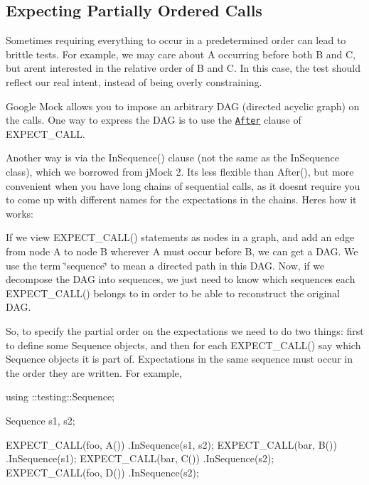 \subsection*{Expecting Partially Ordered Calls}

Sometimes requiring everything to occur in a predetermined order can lead to brittle tests. For example, we may care about {\ttfamily A} occurring before both {\ttfamily B} and {\ttfamily C}, but aren\textquotesingle{}t interested in the relative order of {\ttfamily B} and {\ttfamily C}. In this case, the test should reflect our real intent, instead of being overly constraining.

Google Mock allows you to impose an arbitrary D\+AG (directed acyclic graph) on the calls. One way to express the D\+AG is to use the \href{CheatSheet.md#the-after-clause}{\tt After} clause of {\ttfamily E\+X\+P\+E\+C\+T\+\_\+\+C\+A\+LL}.

Another way is via the {\ttfamily In\+Sequence()} clause (not the same as the {\ttfamily In\+Sequence} class), which we borrowed from j\+Mock 2. It\textquotesingle{}s less flexible than {\ttfamily After()}, but more convenient when you have long chains of sequential calls, as it doesn\textquotesingle{}t require you to come up with different names for the expectations in the chains. Here\textquotesingle{}s how it works\+:

If we view {\ttfamily E\+X\+P\+E\+C\+T\+\_\+\+C\+A\+L\+L()} statements as nodes in a graph, and add an edge from node A to node B wherever A must occur before B, we can get a D\+AG. We use the term \char`\"{}sequence\char`\"{} to mean a directed path in this D\+AG. Now, if we decompose the D\+AG into sequences, we just need to know which sequences each {\ttfamily E\+X\+P\+E\+C\+T\+\_\+\+C\+A\+L\+L()} belongs to in order to be able to reconstruct the original D\+AG.

So, to specify the partial order on the expectations we need to do two things\+: first to define some {\ttfamily Sequence} objects, and then for each {\ttfamily E\+X\+P\+E\+C\+T\+\_\+\+C\+A\+L\+L()} say which {\ttfamily Sequence} objects it is part of. Expectations in the same sequence must occur in the order they are written. For example,


\begin{DoxyCode}
using ::testing::Sequence;

Sequence s1, s2;

EXPECT\_CALL(foo, A())
    .InSequence(s1, s2);
EXPECT\_CALL(bar, B())
    .InSequence(s1);
EXPECT\_CALL(bar, C())
    .InSequence(s2);
EXPECT\_CALL(foo, D())
    .InSequence(s2);
\end{DoxyCode}


